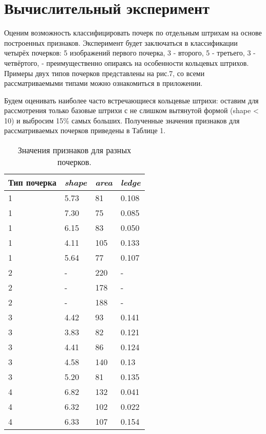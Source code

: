 \documentclass{article}
\begin{document}
\section{Вычислительный эксперимент}
Оценим возможность классифицировать почерк по отдельным штрихам на основе построенных признаков. Эксперимент будет заключаться в классификации четырёх почерков: 5 изображений первого почерка, 3 - второго, 5 - третьего, 3 - четвёртого, - преимущественно опираясь на особенности кольцевых штрихов. Примеры двух типов почерков представлены на рис.7, со всеми рассматриваемыми типами можно ознакомиться в приложении.

Будем оценивать наиболее часто встречающиеся кольцевые штрихи: оставим для рассмотрения только базовые штрихи с не слишком вытянутой формой (shape < 10) и выбросим 15\% самых больших. Полученные значения признаков для рассматриваемых почерков приведены в Таблице 1.

\begin{table}[!h]
    \centering
    \begin{tabular}{|p{4cm}||p{3cm}|p{3cm}|p{3cm}|}
        \hline
        Тип почерка & \emph{shape} & \emph{area} & \emph{ledge}\\ 
        \hline\hline
        1 & 5.73 & 81 & 0.108 \\
        1 & 7.30 & 75 & 0.085 \\
        1 & 6.15 & 83 & 0.050 \\
        1 & 4.11 & 105 & 0.133 \\
        1 & 5.64 & 77 & 0.107 \\
        \hline
        2 & - & 220 & - \\
        2 & - & 178 & - \\
        2 & - & 188 & - \\
        \hline
        3 & 4.42 & 93 & 0.141 \\
        3 & 3.83 & 82 & 0.121 \\
        3 & 4.41 & 86 & 0.124 \\
        3 & 4.58 & 140 & 0.13 \\
        3 & 5.20 & 81 & 0.135 \\
        \hline
        4 & 6.82 & 132 & 0.041 \\
        4 & 6.32 & 102 & 0.022 \\
        4 & 6.33 & 107 & 0.154 \\
        \hline
    \end{tabular}
    \caption{Значения признаков для разных почерков.}
\end{table}
\end{document}
